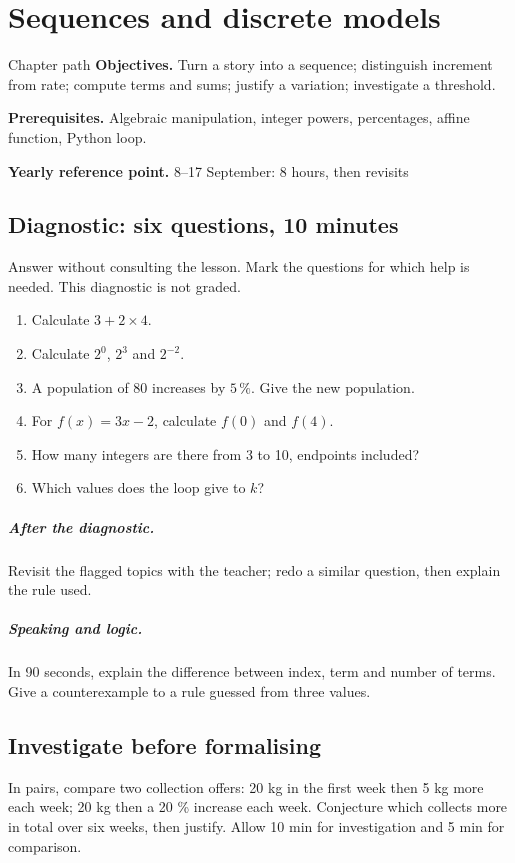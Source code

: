\chapter{Sequences and discrete models}\label{C01}
\begin{repere}{Chapter path}
\textbf{Objectives.} Turn a story into a sequence; distinguish increment from rate; compute terms and sums; justify a variation; investigate a threshold.

\textbf{Prerequisites.} Algebraic manipulation, integer powers, percentages, affine function, Python loop.

\textbf{Yearly reference point.} 8--17 September: 8 hours, then revisits\end{repere}
\section*{Diagnostic: six questions, 10 minutes}\label{C01-D}
Answer without consulting the lesson. Mark the questions for which help is needed. This diagnostic is not graded.
\begin{enumerate}
\item Calculate $3+2\times4$.
\item Calculate $2^0$, $2^3$ and $2^{-2}$.
\item A population of 80 increases by $5\,\%$. Give the new population.
\item For $f(x)=3x-2$, calculate $f(0)$ and $f(4)$.
\item How many integers are there from 3 to 10, endpoints included?
\item Which values does the loop  give to $k$?
\end{enumerate}
\paragraph{After the diagnostic.} Revisit the flagged topics with the teacher; redo a similar question, then explain the rule used.
\paragraph{Speaking and logic.} In 90 seconds, explain the difference between index, term and number of terms. Give a counterexample to a rule guessed from three values.
\clearpage
\section*{Investigate before formalising}\label{C01-RECH}
In pairs, compare two collection offers: 20 kg in the first week then 5 kg more each week; 20 kg then a 20 \% increase each week. Conjecture which collects more in total over six weeks, then justify. Allow 10 min for investigation and 5 min for comparison.
